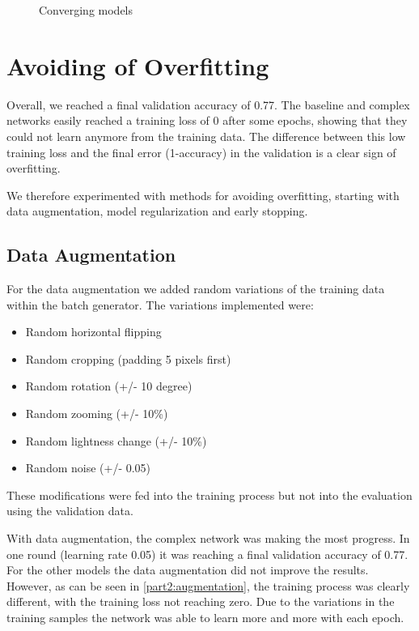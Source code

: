 \documentclass[sigconf,nonacm]{acmart}
\begin{document}
\begin{figure}[ht]
\begin{subfigure}[c]{0.45\columnwidth}
\end{subfigure}
\vspace{-.7\baselineskip}
\caption{Converging models}
\label{part2:converging}
\end{figure}

\section{Avoiding of Overfitting}


Overall, we reached a final validation accuracy of 0.77.
The baseline and complex networks easily reached a
training loss of 0 after some epochs, showing that
they could not learn anymore from the training data.
The difference between this low training loss and
the final error (1-accuracy) in the validation
is a clear sign of overfitting.

We therefore experimented with methods for avoiding
overfitting, starting with data augmentation,
model regularization and early stopping.

\subsection{Data Augmentation}

For the data augmentation we added random variations of
the training data within the batch generator.
The variations implemented were:
\begin{itemize}
\item Random horizontal flipping
\item Random cropping (padding 5 pixels first)
\item Random rotation (+/- 10 degree)
\item Random zooming (+/- 10\%)
\item Random lightness change (+/- 10\%)
\item Random noise (+/- 0.05)
\end{itemize}

These modifications were fed into the training process
but not into the evaluation using the validation data.

With data augmentation, the complex network was making the
most progress. In one round (learning rate 0.05) it was
reaching a final validation accuracy of 0.77.
For the other models the data augmentation did
not improve the results.
However, as can be seen in \ref{part2:augmentation},
the training process was clearly different,
with the training loss not reaching zero.
Due to the variations in the training samples
the network was able to learn
more and more with each epoch.
\end{document}
